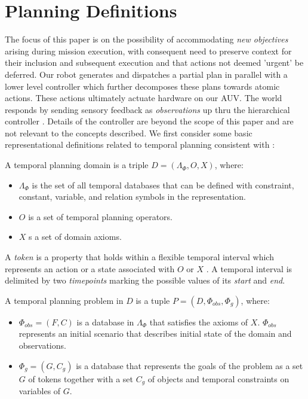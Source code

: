 \section{Planning Definitions}
\label{sec: defs}

The focus of this paper is on the possibility of accommodating \emph{new
  objectives} arising during mission execution, with consequent need
to preserve context for their inclusion and subsequent execution and
that actions not deemed 'urgent' be deferred. Our robot generates and
dispatches a partial plan in parallel with a lower level controller
which further decomposes these plans towards atomic actions. These
actions ultimately actuate hardware on our AUV. The world responds by
sending sensory feedback as \emph{observations} up thru the
hierarchical controller \cite{mcgann08bdup,rajan12dup}. Details of the
controller are beyond the scope of this paper and are not relevant to the
concepts described. We first consider some
basic representational definitions related to temporal planning
consistent with \cite{Nau:2004}:

\begin{definition}
  \label{def:domain}
  A temporal planning domain is a triple $D = ( \Lambda_\Phi, O, X )$, where:
  \begin{itemize}
  \item $\Lambda_\Phi$ is the set of all temporal databases that can
    be defined with constraint, constant, variable, and relation
    symbols in the representation.
  \item $O$ is a set of temporal planning operators.
  \item $X$ s a set of domain axioms.
  \end{itemize}
\end{definition}

A \emph{token} is a property that holds within a flexible temporal
interval which represents an action or a state associated with $O$ or
$X$ \cite{py10dup}. A temporal interval is delimited by two {\em
  timepoints} \cite{Boddy93} marking the possible values of its {\em
  start} and {\em end}.

\begin{definition}
  \label{def:problem}
  A temporal planning problem in $D$ is a tuple $P = ( D, \Phi_{obs}, \Phi_g )$, where:
  \begin{itemize}
  \item $\Phi_{obs} = (F, C)$ is a database in $\Lambda_\Phi$ that
    satisfies the axioms of $X$.  $\Phi_{obs}$ represents an initial
    scenario that describes initial state of the domain and
    observations.
  \item $\Phi_g = (G, C_g)$ is a database that represents the goals of
    the problem as a set $G$ of tokens together with a set $C_g$ of
    objects  and temporal constraints   on variables of $G$.
  \end{itemize}
\end{definition}

